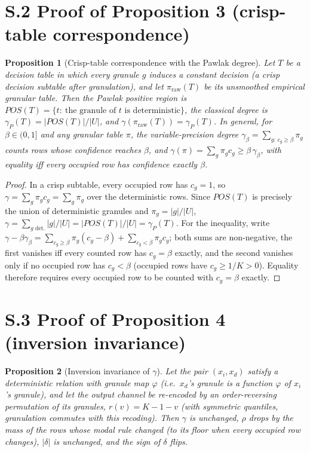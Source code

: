 \documentclass[11pt,a4paper]{article}
\newtheorem*{proposition}{Proposition}
\begin{document}
\section*{S.2 Proof of Proposition 3 (crisp-table correspondence)}

\begin{proposition}[Crisp-table correspondence with the Pawlak degree]
Let $T$ be a decision table in which every granule $g$ induces a constant
decision (a crisp decision subtable after granulation), and let
$\pi_{\mathrm{raw}}(T)$ be its unsmoothed empirical granular table. Then the
Pawlak positive region is $POS(T)=\{t:\ \text{the granule of } t \text{ is
deterministic}\}$, the classical degree is
$\gamma_P(T)=|POS(T)|/|U|$, and $\gamma(\pi_{\mathrm{raw}}(T))=\gamma_P(T)$.
In general, for $\beta\in(0,1]$ and any granular table $\pi$, the
variable-precision degree
$\gamma_\beta=\sum_{g:\,c_g\ge\beta}\pi_g$ counts rows whose confidence
reaches $\beta$, and
$\gamma(\pi)=\sum_g \pi_g c_g \ge \beta\,\gamma_\beta$, with equality iff
every occupied row has confidence exactly $\beta$.
\end{proposition}

\begin{proof}
In a crisp subtable, every occupied row has $c_g=1$, so
$\gamma=\sum_{g}\pi_g c_g=\sum_g \pi_g$ over the deterministic rows. Since
$POS(T)$ is precisely the union of deterministic granules and
$\pi_g=|g|/|U|$, $\gamma=\sum_{g \text{ det.}} |g|/|U| = |POS(T)|/|U| =
\gamma_P(T)$. For the inequality, write
$\gamma-\beta\gamma_\beta
=\sum_{c_g\ge\beta}\pi_g(c_g-\beta)
+\sum_{c_g<\beta}\pi_g c_g$;
both sums are non-negative, the first vanishes iff every counted row has
$c_g=\beta$ exactly, and the second vanishes only if no occupied row has
$c_g<\beta$ (occupied rows have $c_g\ge 1/K>0$). Equality therefore
requires every occupied row to be counted with $c_g=\beta$ exactly.
\end{proof}

\section*{S.3 Proof of Proposition 4 (inversion invariance)}

\begin{proposition}[Inversion invariance of $\gamma$]
Let the pair $(x_i, x_d)$ satisfy a deterministic relation with granule map
$\varphi$ (i.e.\ $x_d$'s granule is a function $\varphi$ of $x_i$'s
granule), and let the output channel be re-encoded by an order-reversing
permutation of its granules, $r(v)=K-1-v$ (with symmetric quantiles,
granulation commutes with this recoding). Then $\gamma$ is unchanged,
$\rho$ drops by the mass of the rows whose modal rule changed (to its
floor when every occupied row changes), $|\delta|$ is unchanged, and the
sign of $\delta$ flips.
\end{proposition}
\end{document}
